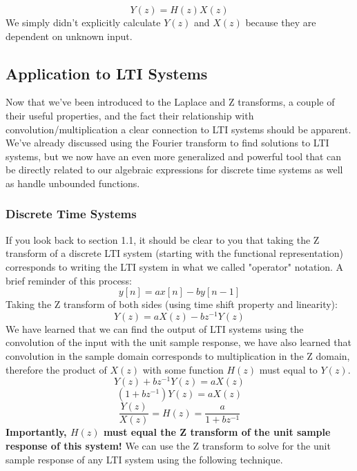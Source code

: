 \documentclass[a4paper]{article}
\numberwithin{equation}{section}
\begin{document}
\begin{equation}
Y(z)=H(z)X(z)
\end{equation}
We simply didn't explicitly calculate $Y(z)$ and $X(z)$ because they are dependent on unknown input. 

\subsection{Application to LTI Systems}
Now that we've been introduced to the Laplace and Z transforms, a couple of their useful properties, and the fact their relationship with convolution/multiplication a clear connection to LTI systems should be apparent. We've already discussed using the Fourier transform to find solutions to LTI systems, but we now have an even more generalized and powerful tool that can be directly related to our algebraic expressions for discrete time systems as well as handle unbounded functions. 

\subsubsection{Discrete Time Systems}
If you look back to section 1.1, it should be clear to you that taking the Z transform of a discrete LTI system (starting with the functional representation) corresponds to writing the LTI system in what we called "operator" notation. A brief reminder of this process:
\begin{equation}
y[n]=ax[n]-by[n-1]
\end{equation}
Taking the Z transform of both sides (using time shift property and linearity):
\begin{equation}
Y(z)=aX(z)-bz^{-1}Y(z)
\end{equation}
We have learned that we can find the output of LTI systems using the convolution of the input with the unit sample response, we have also learned that convolution in the sample domain corresponds to multiplication in the Z domain, therefore the product of $X(z)$ with some function $H(z)$ must equal to $Y(z)$. 
\begin{equation}
Y(z)+bz^{-1}Y(z)=aX(z)
\end{equation}
\begin{equation}
(1+bz^{-1})Y(z)=aX(z)
\end{equation}
\begin{equation}
\frac{Y(z)}{X(z)}=H(z)=\frac{a}{1+bz^{-1}}
\end{equation}
\textbf{Importantly, $H(z)$ must equal the Z transform of the unit sample response of this system!} We can use the Z transform to solve for the unit sample response of any LTI system using the following technique. \\
\end{document}
